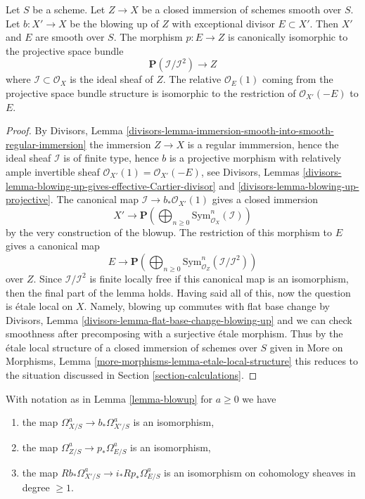 \begin{lemma}
\label{lemma-blowup}
Let $S$ be a scheme. Let $Z \to X$ be a closed immersion of schemes
smooth over $S$. Let $b : X' \to X$ be the blowing up of $Z$ with
exceptional divisor $E \subset X'$. Then $X'$ and $E$ are smooth
over $S$. The morphism $p : E \to Z$ is canonically isomorphic
to the projective space bundle
$$
\mathbf{P}(\mathcal{I}/\mathcal{I}^2) \longrightarrow Z
$$
where $\mathcal{I} \subset \mathcal{O}_X$ is the ideal sheaf
of $Z$. The relative $\mathcal{O}_E(1)$ coming from the projective
space bundle structure is isomorphic to the restriction of
$\mathcal{O}_{X'}(-E)$ to $E$.
\end{lemma}

\begin{proof}
By Divisors, Lemma
\ref{divisors-lemma-immersion-smooth-into-smooth-regular-immersion}
the immersion $Z \to X$ is a regular immmersion, hence
the ideal sheaf $\mathcal{I}$ is of finite type, hence $b$ is a projective
morphism with relatively ample invertible sheaf
$\mathcal{O}_{X'}(1) = \mathcal{O}_{X'}(-E)$, see
Divisors, Lemmas
\ref{divisors-lemma-blowing-up-gives-effective-Cartier-divisor} and
\ref{divisors-lemma-blowing-up-projective}.
The canonical map $\mathcal{I} \to b_*\mathcal{O}_{X'}(1)$
gives a closed immersion
$$
X' \longrightarrow
\mathbf{P}\left(\bigoplus\nolimits_{n \geq 0}
\text{Sym}^n_{\mathcal{O}_X}(\mathcal{I})\right)
$$
by the very construction of the blowup. The restriction of this morphism
to $E$ gives a canonical map
$$
E \longrightarrow
\mathbf{P}\left(\bigoplus\nolimits_{n \geq 0}
\text{Sym}^n_{\mathcal{O}_Z}(\mathcal{I}/\mathcal{I}^2)\right)
$$
over $Z$. Since $\mathcal{I}/\mathcal{I}^2$ is finite locally free
if this canonical map is an isomorphism, then the final part of the
lemma holds. Having said all of this, now the question is \'etale
local on $X$. Namely, blowing up commutes with flat base change by
Divisors, Lemma \ref{divisors-lemma-flat-base-change-blowing-up}
and we can check smoothness after precomposing with a surjective
\'etale morphism. Thus by the \'etale local structure of a
closed immersion of schemes over $S$ given in More on Morphisms, Lemma
\ref{more-morphisms-lemma-etale-local-structure}
this reduces to the situation discussed in
Section \ref{section-calculations}.
\end{proof}

\begin{lemma}
\label{lemma-comparison-general}
With notation as in Lemma \ref{lemma-blowup} for $a \geq 0$ we have
\begin{enumerate}
\item the map
$\Omega^a_{X/S} \to b_*\Omega^a_{X'/S}$ is an isomorphism,
\item the map $\Omega^a_{Z/S} \to p_*\Omega^a_{E/S}$ is an isomorphism,
\item the map $Rb_*\Omega^a_{X'/S} \to i_*Rp_*\Omega^a_{E/S}$ is an isomorphism
on cohomology sheaves in degree $\geq 1$.
\end{enumerate}
\end{lemma}

